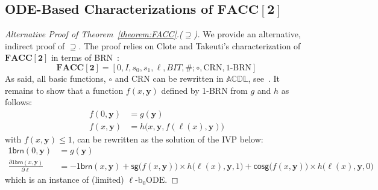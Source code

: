 \documentclass[11pt, oneside]{article}
\newenvironment{toappendix}{}{}
\newcommand{\longv}[1]{}
\newcommand{\fun}[1]{\mathsf{#1}}
\newcommand{\FACC}{\mathbf{FACC[2]}}
\newcommand{\tu}[1]{\mathbf{#1}}
\newtheorem{theorem}{Theorem}
\theoremstyle{definition}
\newcommand{\ODEACC}{\ell\text{-ODE}_{\text{FACC[2]}}}
\newcommand{\schODE}{\ell\text{-b}_0\text{ODE}}
\begin{document}
\begin{toappendix}
\subsection{ODE-Based Characterizations of $\FACC$}

\begin{proof}[Alternative Proof of Theorem~\ref{theorem:FACC}.($\supseteq$)]
We provide an alternative, indirect proof of $\supseteq$.
The proof relies on Clote and Takeuti's characterization of $\FACC$ in terms of BRN~\cite{CloteTakeuti}:
$$
\FACC = [0, I, s_0, s_1, \ell, BIT, \#; \circ, \text{CRN}, \text{1-BRN}]
$$
As said, all basic functions, $\circ$ and CRN can be rewritten in $\mathbb{ACDL}$, see~\cite{ADK24a}.
It remains to show that a function $f(x, \tu y)$ defined by 1-BRN from $g$ and $h$ as follows:
\begin{align*}
    f(0, \tu y) &= g(\tu y) \\
    f(x, \tu y) &= h\big(x, \tu y, f(\ell(x), \tu y)\big)
\end{align*}
with $f(x, \tu y)\leq 1$, can be rewritten as the solution of the IVP below:
\begin{align*}
    \fun{1brn}(0, \tu y) &= g(\tu y) \\
    \frac{\partial \fun{1brn}(x, \tu y)}{\partial \ell} &= - \fun{1brn}(x, \tu y) + \fun{sg}\big(f(x, \tu y)\big) \times h\big(\ell(x), \tu y, 1\big) + \fun{cosg}\big(f(x, \tu y)\big) \times h\big(\ell(x), \tu y, 0\big)
\end{align*}
which is an instance of (limited) $\schODE$.
\end{proof}



\longv{
\begin{theorem}%
$\FACC
= 
[\fun{0}, \fun{1}, \ell, \fun{sg}, +, -, \div 2, \pi^p_i, \#; \circ, \ell\emph{-ODE}_1, \ell\emph{-ODE}_3, \ODEACC]
$
%
\end{theorem}

\begin{proof}
    $\subseteq$ Following the closure proofs from~\cite{ADK24a} plus Lemma~\ref{lemma:FACCone} and Lemma~\ref{lemma:schODE} for $\ODEACC$ and $\schODE$, respectively.

    $\supseteq$ Consequence of the fact that (unbounded fan-in) \textsc{Mod 2} computation or parity can be simulated by $\ODEACC$ (see Remark~\ref{remark:mod2}).
\end{proof}
}
\end{toappendix}
\end{document}
